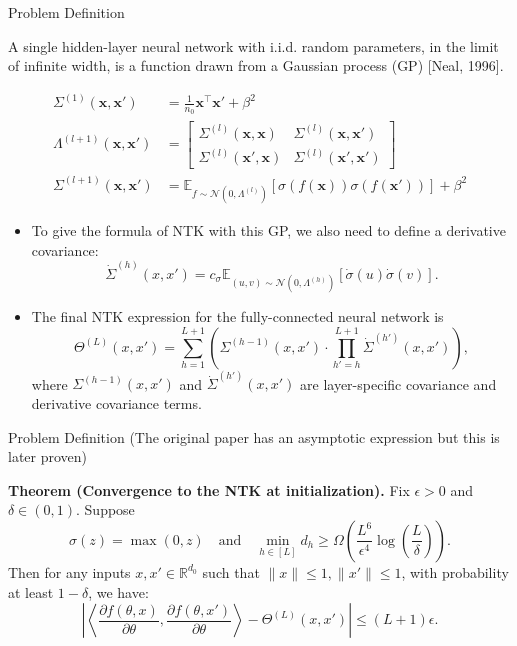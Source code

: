 \documentclass[serif, aspectratio=169]{beamer}
\begin{document}
\begin{frame}{Problem Definition}
	
	
	A single hidden-layer neural network with i.i.d. random parameters, in the limit
	of infinite width, is a function drawn from a Gaussian process (GP) [Neal, 1996].
	
	\[
	\begin{aligned}
		\Sigma^{(1)}(\mathbf{x}, \mathbf{x}') &= \frac{1}{n_0}\mathbf{x}^\top{\mathbf{x}'} + \beta^2 \\
		\Lambda^{(l+1)}(\mathbf{x}, \mathbf{x}') &= \begin{bmatrix}
			\Sigma^{(l)}(\mathbf{x}, \mathbf{x}) & \Sigma^{(l)}(\mathbf{x}, \mathbf{x}') \\
			\Sigma^{(l)}(\mathbf{x}', \mathbf{x}) & \Sigma^{(l)}(\mathbf{x}', \mathbf{x}')
		\end{bmatrix} \\
		\Sigma^{(l+1)}(\mathbf{x}, \mathbf{x}') &= \mathbb{E}_{f \sim \mathcal{N}(0, \Lambda^{(l)})}[\sigma(f(\mathbf{x})) \sigma(f(\mathbf{x}'))] + \beta^2
	\end{aligned}
	\]
	
	
\end{frame}


\begin{frame}

 \begin{itemize}
 	
 \item To give the formula of NTK with this GP, we also need to define a derivative covariance:
 \[
 \dot{\Sigma}^{(h)}(x, x') = c_\sigma \mathbb{E}_{(u, v) \sim \mathcal{N}(0, \Lambda^{(h)})} \left[ \dot{\sigma}(u) \dot{\sigma}(v) \right].
 \]
 
 \item The final NTK expression for the fully-connected neural network is
 \[
 \Theta^{(L)}(x, x') = \sum_{h=1}^{L+1} \left( \Sigma^{(h-1)}(x, x') \cdot \prod_{h'=h}^{L+1} \dot{\Sigma}^{(h')}(x, x') \right),
 \]
 where \( \Sigma^{(h-1)}(x, x') \) and \( \dot{\Sigma}^{(h')}(x, x') \) are layer-specific covariance and derivative covariance terms.
 
 \end{itemize}
\end{frame}
 
 \begin{frame}{Problem Definition}
 	(The original paper has an asymptotic expression but this is later proven)
 	
 \textbf{Theorem (Convergence to the NTK at initialization).} Fix $\epsilon > 0$ and $\delta \in (0,1)$. Suppose 
 \[
 \sigma(z) = \max(0, z) \quad \text{and} \quad \min_{h \in [L]} d_h \geq \Omega\left(\frac{L^6}{\epsilon^4} \log\left(\frac{L}{\delta}\right)\right).
 \]
 Then for any inputs $x, x' \in \mathbb{R}^{d_0}$ such that $\|x\| \leq 1, \|x'\| \leq 1$, with probability at least $1 - \delta$, we have:
 \[
 \left| \left\langle \frac{\partial f(\theta, x)}{\partial \theta}, \frac{\partial f(\theta, x')}{\partial \theta} \right\rangle - \Theta^{(L)}(x, x') \right| \leq (L + 1)\epsilon.
 \]
 \end{frame}
 
\end{document}
